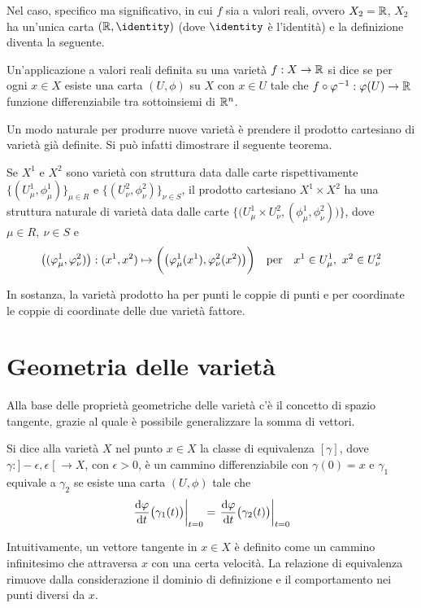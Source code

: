 Nel caso, specifico ma significativo, in cui $f$ sia a valori reali, ovvero $X_2 = \mathbb{R}$, $X_2$ ha un'unica carta $(\R, \identity)$ (dove $\identity$ è l'identità) e la definizione diventa la seguente.
\begin{definition}
  Un'applicazione a valori reali definita su una varietà $f:X\to \mathbb{R}$ si dice  se per ogni $x \in X$ esiste una carta $(U, \phi)$ su $X$ con $x \in  U$ tale che $f\circ \varphi^{-1}: \varphi(U) \to \mathbb{R}$ funzione differenziabile tra sottoinsiemi di $\mathbb{R}^{n}$.
\end{definition}

Un modo naturale per produrre nuove varietà è prendere il prodotto cartesiano di varietà già definite. Si può infatti dimostrare il seguente teorema.
\begin{theorem}
  Se $X^1$ e $X^2$ sono varietà con struttura data dalle carte rispettivamente $\big\lbrace(U^1_{\mu}, \phi^1_{\mu})\big\rbrace_{\mu \in R}$ e $\big\lbrace (U^2_{\nu}, \phi^2_{\nu})\big\rbrace_{\nu \in S}$, il prodotto cartesiano $X^1 \times X^2$ ha una struttura naturale di varietà data dalle carte $\Big\lbrace\big( U^1_{\mu} \times U^2_{\nu}, (\phi^1_{\mu},\phi^2_{\nu})\big)\Big\rbrace$, dove $\mu \in  R,\ \nu \in S$ e \begin{equation*}
    \big((\phi^1_{\mu},\phi^2_{\nu})\big): (x^1,x^2) \mapsto \bigg(\big(\phi^1_{\mu}(x^1),\phi^2_{\nu}(x^2)\big)\bigg) \qqtext{per} x^1 \in U^1_{\mu},\ x^2 \in  U^2_{\nu}
  \end{equation*} 
\end{theorem}
\begin{remark}
  In sostanza, la varietà prodotto ha per punti le coppie di punti e per coordinate le coppie di coordinate delle due varietà fattore.
\end{remark}

\section{Geometria delle varietà}
Alla base delle proprietà geometriche delle varietà c'è il concetto di spazio tangente, grazie al quale è possibile generalizzare la somma di vettori.  

\begin{definition}
  Si dice  alla varietà $X$ nel punto $x \in  X$ la classe di equivalenza $[\gamma]$, dove $\gamma:]-\epsilon,\epsilon\;[\ \to X$, con $\epsilon > 0$, è un cammino differenziabile con $\gamma(0) = x$ e $\gamma_1$ equivale a $\gamma_2$ se esiste una carta $(U, \phi)$ tale che \begin{equation*}
  \eval{\dv{\phi}{t}\big(\gamma_1(t)\big)}_{t=0} = \eval{\dv{\phi}{t}\big(\gamma_2(t)\big)}_{t=0}
  \end{equation*} 
\end{definition}
\begin{remark}
  Intuitivamente, un vettore tangente in $x \in X$ è definito come un cammino infinitesimo che attraversa $x$ con una certa velocità. La relazione di equivalenza rimuove dalla considerazione il dominio di definizione e il comportamento nei punti diversi da $x$.
\end{remark}

